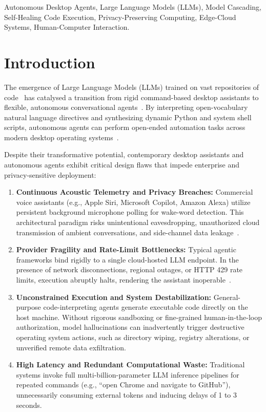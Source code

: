\documentclass[conference]{IEEEtran}
\begin{document}
\begin{IEEEkeywords}
Autonomous Desktop Agents, Large Language Models (LLMs), Model Cascading, Self-Healing Code Execution, Privacy-Preserving Computing, Edge-Cloud Systems, Human-Computer Interaction.
\end{IEEEkeywords}

\section{Introduction}
\label{sec:intro}
The emergence of Large Language Models (LLMs) trained on vast repositories of code~\cite{chen2021codex,roziere2024code,hui2024qwen25coder} has catalysed a transition from rigid command-based desktop assistants to flexible, autonomous conversational agents~\cite{openinterpreter2024,packer2023memgpt}. By interpreting open-vocabulary natural language directives and synthesizing dynamic Python and system shell scripts, autonomous agents can perform open-ended automation tasks across modern desktop operating systems~\cite{li2024osworld,deng2024mind2web}.

Despite their transformative potential, contemporary desktop assistants and autonomous agents exhibit critical design flaws that impede enterprise and privacy-sensitive deployment:
\begin{enumerate}
    \item \textbf{Continuous Acoustic Telemetry and Privacy Breaches:} Commercial voice assistants (e.g., Apple Siri, Microsoft Copilot, Amazon Alexa) utilize persistent background microphone polling for wake-word detection. This architectural paradigm risks unintentional eavesdropping, unauthorized cloud transmission of ambient conversations, and side-channel data leakage~\cite{malkin2022privacy}.
    \item \textbf{Provider Fragility and Rate-Limit Bottlenecks:} Typical agentic frameworks bind rigidly to a single cloud-hosted LLM endpoint. In the presence of network disconnections, regional outages, or HTTP 429 rate limits, execution abruptly halts, rendering the assistant inoperable~\cite{shinn2023reflexion}.
    \item \textbf{Unconstrained Execution and System Destabilization:} General-purpose code-interpreting agents generate executable code directly on the host machine. Without rigorous sandboxing or fine-grained human-in-the-loop authorization, model hallucinations can inadvertently trigger destructive operating system actions, such as directory wiping, registry alterations, or unverified remote data exfiltration.
    \item \textbf{High Latency and Redundant Computational Waste:} Traditional systems invoke full multi-billion-parameter LLM inference pipelines for repeated commands (e.g., ``open Chrome and navigate to GitHub''), unnecessarily consuming external tokens and inducing delays of 1 to 3 seconds.
\end{enumerate}
\end{document}
